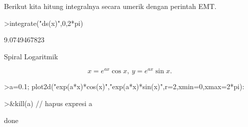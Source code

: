 \documentclass{article}
\begin{document}
\begin{eulernotebook}
\begin{eulercomment}
\begin{eulercomment}
\begin{eulercomment}
\begin{eulercomment}
\begin{eulercomment}
Berikut kita hitung integralnya secara umerik dengan perintah EMT.
\end{eulercomment}
\begin{eulerprompt}
>integrate("ds(x)",0,2*pi)
\end{eulerprompt}
\begin{euleroutput}
  9.0749467823
\end{euleroutput}
\begin{eulercomment}
Spiral Logaritmik

\end{eulercomment}
\begin{eulerformula}
\[
x=e^{ax}\cos x,\ y=e^{ax}\sin x.
\]
\end{eulerformula}
\begin{eulerprompt}
>a=0.1; plot2d("exp(a*x)*cos(x)","exp(a*x)*sin(x)",r=2,xmin=0,xmax=2*pi):
\end{eulerprompt}
\begin{eulerprompt}
>&kill(a) // hapus expresi a
\end{eulerprompt}
\begin{euleroutput}
  
                                   done
  

\end{euleroutput}
\end{eulercomment}
\end{eulercomment}
\end{eulercomment}
\end{eulercomment}
\end{eulernotebook}
\end{document}

